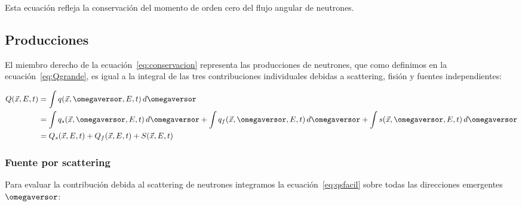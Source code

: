 Esta ecuación refleja la conservación del momento de orden cero del flujo angular de neutrones.

\subsection{Producciones} %

El miembro derecho de la ecuación~\eqref{eq:conservacion} representa las producciones de neutrones, que como definimos en la ecuación~\eqref{eq:Qgrande}, es igual a la integral de las tres contribuciones individuales debidas a scattering, fisión y fuentes independientes:

\begin{align*}
 Q(\vec{x}, E, t) &= \int q(\vec{x}, \omegaversor, E, t) \, d\omegaversor \\
&= \int q_s(\vec{x}, \omegaversor, E, t) \, d\omegaversor
 + \int q_f(\vec{x}, \omegaversor, E, t) \, d\omegaversor
 + \int s(\vec{x}, \omegaversor, E, t) \, d\omegaversor \\
&= Q_s(\vec{x}, E, t) + Q_f(\vec{x}, E, t) + S(\vec{x}, E, t)
\end{align*}

\subsubsection{Fuente por scattering} %

Para evaluar la contribución debida al scattering de neutrones integramos la ecuación~\eqref{eq:qsfacil} sobre todas las direcciones emergentes~$\omegaversor$:

% 
% 

